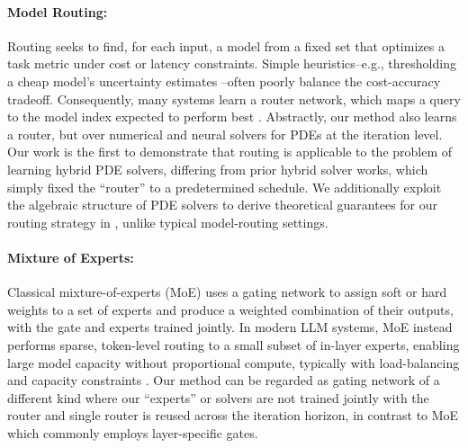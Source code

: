 \documentclass{article} %
\begin{document}
\paragraph{Model Routing:} Routing \citep{shnitzer2023large,hu2024routerbench,ding2024hybrid,huang2025routereval} seeks to find, for each input, a model from a fixed set that optimizes a task metric under cost or latency constraints. Simple heuristics--e.g., thresholding a cheap model's uncertainty estimates \citep{chuang2024learning,chuang2025confident}--often poorly balance the cost-accuracy tradeoff. Consequently, many systems learn a router network, which maps a query to the model index expected to perform best \citep{hari2023tryage,mohammadshahi2024routoo,vsakota2024fly}. Abstractly, our method also learns a router, but over numerical and neural solvers for PDEs at the iteration level. Our work is the first to demonstrate that routing is applicable to the problem of learning hybrid PDE solvers, differing from prior hybrid solver works, which simply fixed the ``router'' to a predetermined schedule. We additionally exploit the algebraic structure of PDE solvers to derive theoretical guarantees for our routing strategy in , unlike typical model-routing settings.

\paragraph{Mixture of Experts:} Classical mixture-of-experts (MoE) \citep{jacobs1991adaptive,jordan1994hierarchical} uses a gating network to assign soft or hard weights to a set of experts and produce a weighted combination of their outputs, with the gate and experts trained jointly. In modern LLM systems, MoE instead performs sparse, token-level routing to a small subset of in-layer experts, enabling large model capacity without proportional compute, typically with load-balancing and capacity constraints \citep{shazeer2017outrageously,lepikhin2020gshard,fedus2022switch,jiang2024mixtral}. 
Our method can be regarded as gating network of a different kind where our ``experts'' or solvers are not trained jointly with the router and single router is reused across the iteration horizon, in contrast to MoE which commonly employs layer-specific gates.



\end{document}
